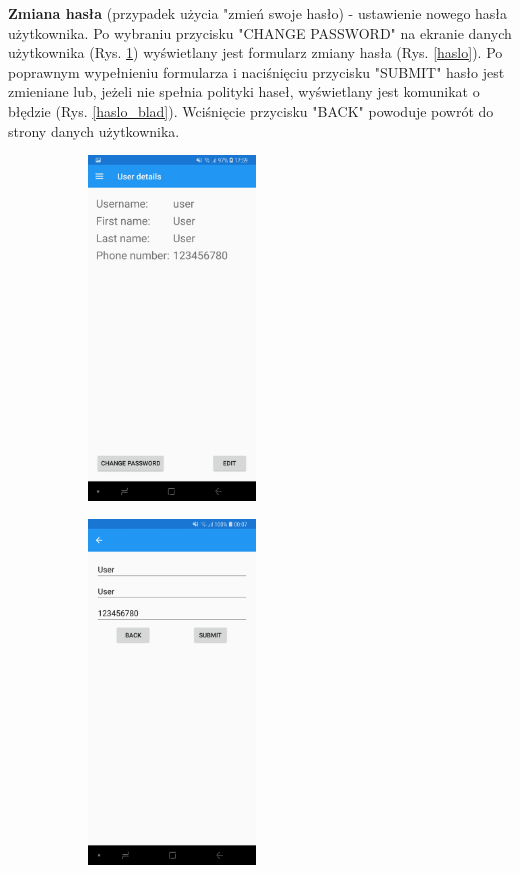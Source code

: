 \textbf{Zmiana hasła} (przypadek użycia "zmień swoje hasło) - ustawienie nowego hasła użytkownika. Po wybraniu przycisku "CHANGE PASSWORD" na ekranie danych użytkownika (Rys. \ref{uzytkownik_pass}) wyświetlany jest formularz zmiany hasła (Rys. \ref{haslo}). Po poprawnym wypełnieniu formularza i naciśnięciu przycisku "SUBMIT" hasło jest zmieniane lub, jeżeli nie spełnia polityki haseł, wyświetlany jest komunikat o błędzie (Rys. \ref{haslo_blad}). Wciśnięcie przycisku "BACK" powoduje powrót do strony danych użytkownika.
\begin{figure}[!ht]
	\begin{center}
		\begin{subfigure}[b]{0.3\textwidth}
			\includegraphics[width=1.75in]{img/mobile/uzytkownik.jpg}
			\label{uzytkownik_pass}
		\end{subfigure}
		\begin{subfigure}[b]{0.3\textwidth}
			\includegraphics[width=1.75in]{img/mobile/edycja_uzytkownika.jpg}

\end{subfigure}
\end{center}
\end{figure}

